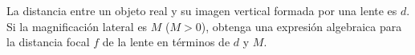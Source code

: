 \item La distancia entre un objeto real y su imagen vertical formada por una lente es $d$. Si la magnificación lateral es $M$ ($M > 0$), obtenga una expresión algebraica para la distancia focal $f$ de la lente en términos de $d$ y $M$.